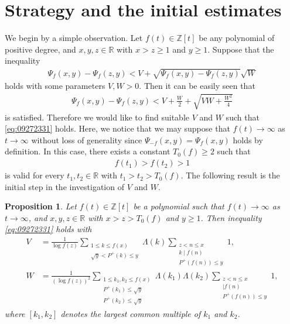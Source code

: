 \documentclass[a4paper,11pt]{amsart}
\newtheorem{proposition}[theorem]{Proposition}
\theoremstyle{definition}
\numberwithin{equation}{section}
\begin{document}
\section{Strategy and the initial estimates}\label{sec:2}
We begin by a simple observation. 
Let $f(t) \in \mathbb{Z}[t]$ be any polynomial of positive degree, and $x,y,z \in \mathbb{R}$ with $x>z \geq1$ and $y \geq1$. 
Suppose that the inequality 
\begin{align}\label{eq:09272331}
\Psi_f(x,y)-\Psi_f(z,y)
< V+ \sqrt{\Psi_f(x,y)-\Psi_f(z,y)} \sqrt{W}
\end{align}
holds with some parameters $V, W>0$. 
Then it can be easily seen that
\begin{align}\label{eq:10022027}
\Psi_f(x,y)-\Psi_f(z,y)
< V+\frac{W}{2}+\sqrt{VW+\frac{W^2}{4}}
\end{align}
is satisfied. 
Therefore we would like to find suitable $V$ and $W$ such that \eqref{eq:09272331} holds. 
Here, we notice that we may suppose that $f(t) \to\infty$ as $t \to\infty$ without loss of generality since $\Psi_{-f}(x,y)=\Psi_f(x,y)$ holds by definition. 
In this case, there exists a constant $T_0(f) \geq2$ such that 
\begin{align}\label{eq:09291328}
f(t_1)
> f(t_2)
> 1
\end{align}
is valid for every $t_1,t_2 \in \mathbb{R}$ with $t_1>t_2>T_0(f)$. 
The following result is the initial step in the investigation of $V$ and $W$. 

\begin{proposition}\label{prop:2.1}
Let $f(t) \in \mathbb{Z}[t]$ be a polynomial such that $f(t) \to\infty$ as $t \to\infty$, and $x,y,z \in \mathbb{R}$ with $x>z>T_0(f)$ and $y \geq1$. 
Then inequality \eqref{eq:09272331} holds with
\begin{align*}
V
&= \frac{1}{\log{f(z)}} \sum_{\substack{1 \leq k \leq f(x) \\ \sqrt{y} < P^+(k) \leq y}} \Lambda(k)
\sum_{\substack{z<n \leq x \\ k \mid f(n) \\ P^+(f(n)) \leq y}} 1, \\
W
&= \frac{1}{(\log{f(z)})^2} \sum_{\substack{1 \leq k_1,k_2 \leq f(x) \\ P^+(k_1) \leq \sqrt{y} \\ P^+(k_2) \leq \sqrt{y}}} \Lambda(k_1) \Lambda(k_2)
\sum_{\substack{z<n \leq x \\ [k_1,k_2] \mid f(n) \\ P^+(f(n)) \leq y}} 1, 
\end{align*}
where $[k_1,k_2]$ denotes the largest common multiple of $k_1$ and $k_2$. 
\end{proposition}
\end{document}
